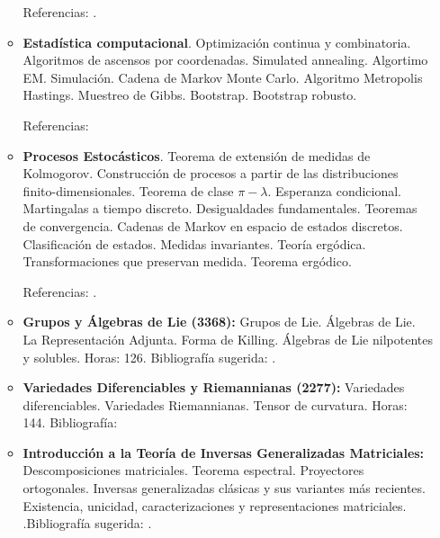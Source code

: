 \documentclass[a4paper, 12pt]{article}
\begin{document}
\begin{enumerate}
\begin{itemize}
 
Referencias:  \cite{anderson, Everitt,  Hair, Jimenez2005,  Cuadras, mardia, Penia, johnson, Rencher}.







\item \textbf{Estadística computacional}. 
Optimización   continua y combinatoria. Algoritmos de ascensos por coordenadas. Simulated annealing. Algortimo EM. Simulación. Cadena de Markov Monte Carlo. Algoritmo Metropolis Hastings. Muestreo de Gibbs. Bootstrap. Bootstrap robusto.  


Referencias:    \cite{wrma, wrre, giho}




\item \textbf{Procesos Estocásticos}. Teorema de extensión de  medidas de Kolmogorov. Construcción de procesos a partir
de las distribuciones finito-dimensionales. Teorema de  clase $\pi-\lambda$. Esperanza condicional. Martingalas a tiempo
discreto. Desigualdades fundamentales. Teoremas de convergencia. Cadenas de Markov en espacio de estados discretos.
Clasificación de estados. Medidas invariantes. Teoría ergódica. Transformaciones que preservan medida. Teorema ergódico.

 

 Referencias: \cite{bremaud,ferrari, shir,   varadhan}.



\item\textbf{ Grupos y Álgebras de Lie (3368):}  Grupos de Lie. Álgebras de Lie. La Representación Adjunta. Forma de Killing. Álgebras de Lie nilpotentes y solubles.
Horas: 126. Bibliografía sugerida: \cite{boothby2003introduction, Helgason15,Loring11, Knapp96,Jancsa10,barros22}.

\item\textbf{ Variedades Diferenciables y Riemannianas  (2277):}
 Variedades diferenciables.  Variedades Riemannianas. Tensor de curvatura.  
 Horas: 144. Bibliografía: \cite{boothby2003introduction,docarmo15, 
 Carrizosev,Helgason15,Olmos18,Loring11,barros11}


\item\textbf{ Introducción a la Teoría de Inversas Generalizadas Matriciales:}  Descomposiciones matriciales. Teorema espectral. Proyectores ortogonales. Inversas generalizadas clásicas y sus variantes más recientes. Existencia, unicidad, caracterizaciones y representaciones matriciales. .Bibliografía sugerida: \cite{BeGr, CaMe, WaWeQi, MiBhMa, BaTr1, BaTr2, FeLeTh1, FeLeTh2, FeLeTh3, FeLePrTh, MaTh, PrMo,  MeSa, Wa}.


\end{itemize}
\end{enumerate}
\end{document}
